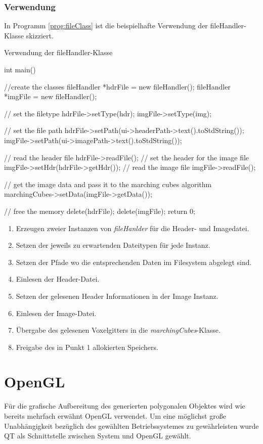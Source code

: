 \subsubsection{Verwendung}
In Programm \ref{prog:fileClass} ist die beispielhafte Verwendung der fileHandler-Klasse skizziert.
\begin{program}[H]
	\caption{Verwendung der fileHandler-Klasse}
	\label{prog:fileClass}
	\begin{CCode}
		int main(){
			//create the classes
			fileHandler *hdrFile = new fileHandler();
			fileHandler *imgFile = new fileHandler();
			
			// set the filetype
			hdrFile->setType(hdr);
			imgFile->setType(img);
			
			// set the file path
			hdrFile->setPath(ui->headerPath->text().toStdString());
			imgFile->setPath(ui->imagePath->text().toStdString());
			
			// read the header file
			hdrFile->readFile();
			// set the header for the image file
			imgFile->setHdr(hdrFile->getHdr());
			// read the image file
			imgFile->readFile();
			
			// get the image data and pass it to the marching cubes algorithm
			marchingCubes->setData(imgFile->getData());
			
			// free the memory
			delete(hdrFile);
			delete(imgFile);
			return 0;	
		}
	\end{CCode}
\end{program}
\begin{enumerate}
	\item Erzeugen zweier Instanzen von \textit{fileHanlder} für die Header- und Imagedatei.
	\item Setzen der jeweils zu erwartenden Dateitypen für jede Instanz.
	\item Setzen der Pfade wo die entsprechenden Daten im Filesystem abgelegt sind.
	\item Einlesen der Header-Datei.
	\item Setzen der gelesenen Header Informationen in der Image Instanz.
	\item Einlesen der Image-Datei.
	\item Übergabe des gelesenen Voxelgitters in die \textit{marchingCubes}-Klasse.
	\item Freigabe des in Punkt 1 allokierten Speichers.
\end{enumerate}
\section{OpenGL}
Für die grafische Aufbereitung des generierten polygonalen Objektes wird wie bereits mehrfach erwähnt OpenGL verwendet. Um eine möglichst große Unabhängigkeit bezüglich des gewählten Betriebssystemes zu gewährleisten wurde QT als Schnittstelle zwischen System und OpenGL gewählt.
